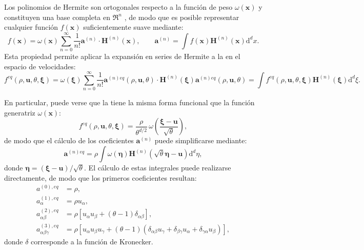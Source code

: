 Los polinomios de Hermite son ortogonales respecto a la funci\'on de peso $\omega(\bm{x})$ y constituyen una base completa en $\Re^n$ \cite{wiener_fourier_1989}, de modo que es posible representar cualquier funci\'on $f(\bm{x})$ suficientemente suave mediante:
\begin{equation}
	f(\bm{x}) = \omega(\bm{x}) \sum_{n=0}^{\infty}\dfrac{1}{n!}\bm{a}^{(n)} \cdot \bm{H}^{(n)}(\bm{x}), \qquad 
	\bm{a}^{(n)} = \int f(\bm{x})\bm{H}^{(n)}(\bm{x}) \mbox{d}^d x.
\end{equation}
Esta propiedad permite aplicar la expansi\'on en series de Hermite a la \edf{} en el espacio de velocidades:
\begin{subequations}
	\begin{equation}
		f^{eq}(\rho, \bm{u}, \theta, \bm{\xi}) = \omega(\bm{\xi}) \sum_{n=0}^{\infty}\dfrac{1}{n!}\bm{a}^{(n)eq}(\rho, \bm{u}, \theta) \cdot \bm{H}^{(n)}(\bm{\xi})
	\end{equation}
	\begin{equation}
		\bm{a}^{(n)eq}(\rho, \bm{u}, \theta) = \int f^{eq}(\rho, \bm{u}, \theta, \bm{\xi})\bm{H}^{(n)}(\bm{\xi}) \mbox{d}^d \xi.
	\end{equation}
	\label{eq:feq_hermite}
\end{subequations}

En particular, puede verse que la \edf{} tiene la misma forma funcional que la funci\'on generatriz $\omega(\bm{x})$:
\begin{equation}
	f^{eq}(\rho, \bm{u}, \theta, \bm{\xi}) = \dfrac{\rho}{\theta^{d/2}} \, \omega \left( \dfrac{\bm{\xi} - \bm{u}}{\sqrt{\theta}} \right),
\end{equation}
de modo que el c\'alculo de los coeficientes $\bm{a}^{(n)}$ puede simplificarse mediante:
\begin{equation}
	\bm{a}^{(n)eq} = \rho \int \omega(\bm{\eta})\bm{H}^{(n)}(\sqrt{\theta}\bm{\eta} - \bm{u}) \mbox{d}^d \eta,
\end{equation}
donde $\bm{\eta} = (\bm{\xi} - \bm{u})/\sqrt{\theta}$. El c\'alculo de estas integrales puede realizarse directamente, de modo que los primeros coeficientes resultan:
\begin{subequations}
	\begin{align}
		a^{(0),eq}          &= \rho,              \\ 
		a^{(1),eq}_{\alpha} &= \rho u_{\alpha},  \\
		a^{(2),eq}_{\alpha\beta} &= \rho \left[ u_{\alpha} u_{\beta} + (\theta-1)\delta_{\alpha\beta} \right],   \\
		a^{(3),eq}_{\alpha\beta\gamma} &= \rho \left[ u_{\alpha} u_{\beta} u_{\gamma} + (\theta-1)(\delta_{\alpha\beta}u_{\gamma} + \delta_{\beta\gamma}u_{\alpha} + \delta_{\gamma\alpha}u_{\beta}) \right],
	\end{align}
	\label{eq:eq_coeffs}
\end{subequations}
donde $\delta$ corresponde a la funci\'on de Kronecker.

